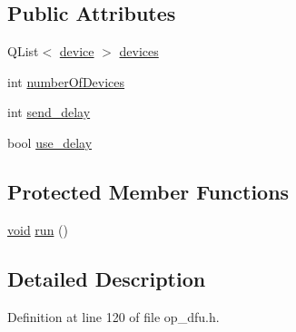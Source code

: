 \subsection*{\-Public \-Attributes}
\begin{DoxyCompactItemize}
\item 
\-Q\-List$<$ \hyperlink{struct_o_p___d_f_u_1_1device}{device} $>$ \hyperlink{class_o_p___d_f_u_1_1_d_f_u_object_ae14ca1c854c2c8378f1c6f0e7c504732}{devices}
\item 
int \hyperlink{class_o_p___d_f_u_1_1_d_f_u_object_a805f4ba165cc9592522fbc928d06c08d}{number\-Of\-Devices}
\item 
int \hyperlink{class_o_p___d_f_u_1_1_d_f_u_object_a0a420df742f4528dde9d22a28526a8f3}{send\-\_\-delay}
\item 
bool \hyperlink{class_o_p___d_f_u_1_1_d_f_u_object_a5e6ad3fb431eb0220a06c934b13ae276}{use\-\_\-delay}
\end{DoxyCompactItemize}
\subsection*{\-Protected \-Member \-Functions}
\begin{DoxyCompactItemize}
\item 
\hyperlink{group___u_a_v_objects_plugin_ga444cf2ff3f0ecbe028adce838d373f5c}{void} \hyperlink{group___uploader_gadb19927303aa24b5505dce3adbb532a2}{run} ()
\end{DoxyCompactItemize}


\subsection{\-Detailed \-Description}


\-Definition at line 120 of file op\-\_\-dfu.\-h.




